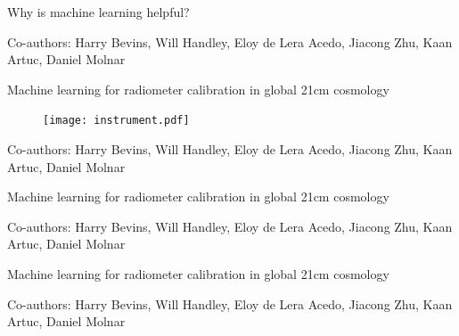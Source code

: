 \documentclass{beamer}
\begin{document}
\begin{frame}{\small{Why is machine learning helpful?}}
\begin{figure}[h]
  \centering
  
\end{figure}

\vfill
    \tiny{Co-authors: Harry Bevins, Will Handley, Eloy de Lera Acedo, Jiacong Zhu, Kaan Artuc, Daniel Molnar}
  \end{frame}

\begin{frame}{\small{Machine learning for radiometer calibration in global 21cm cosmology}}
  \begin{figure}
    \centering
    \texttt{[image: instrument.pdf]}
  \end{figure}
\vfill
    \tiny{Co-authors: Harry Bevins, Will Handley, Eloy de Lera Acedo, Jiacong Zhu, Kaan Artuc, Daniel Molnar}
  \end{frame}

  \begin{frame}{\small{Machine learning for radiometer calibration in global 21cm cosmology}}
    \begin{figure}
    \centering
    
  \end{figure}
\vfill
    \tiny{Co-authors: Harry Bevins, Will Handley, Eloy de Lera Acedo, Jiacong Zhu, Kaan Artuc, Daniel Molnar}

  \end{frame}

  \begin{frame}{\small{Machine learning for radiometer calibration in global 21cm cosmology}}
    \begin{figure}
      \centering
      
    \end{figure}

    \begin{figure}
    \centering
    
  \end{figure}
\vfill
    \tiny{Co-authors: Harry Bevins, Will Handley, Eloy de Lera Acedo, Jiacong Zhu, Kaan Artuc, Daniel Molnar}
  \end{frame}
\end{document}
